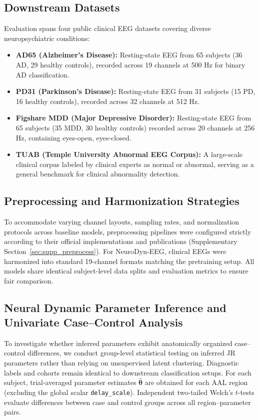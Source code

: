 \documentclass{article}
\begin{document}
{\subsection{Downstream Datasets}
Evaluation spans four public clinical EEG datasets covering diverse neuropsychiatric conditions:
\begin{itemize}
    \item \textbf{AD65 (Alzheimer's Disease):} Resting-state EEG from 65 subjects (36 AD, 29 healthy controls), recorded across 19 channels at 500 Hz for binary AD classification.
    \item \textbf{PD31 (Parkinson's Disease):} Resting-state EEG from 31 subjects (15 PD, 16 healthy controls), recorded across 32 channels at 512 Hz.
    \item \textbf{Figshare MDD (Major Depressive Disorder):} Resting-state EEG from 65 subjects (35 MDD, 30 healthy controls) recorded across 20 channels at 256 Hz, containing eyes-open, eyes-closed.
    \item \textbf{TUAB (Temple University Abnormal EEG Corpus):} A large-scale clinical corpus labeled by clinical experts as normal or abnormal, serving as a general benchmark for clinical abnormality detection.
\end{itemize}

\subsection{Preprocessing and Harmonization Strategies}
\label{sec:downstream_preproc}
To accommodate varying channel layouts, sampling rates, and normalization protocols across baseline models, preprocessing pipelines were configured strictly according to their official implementations and publications (Supplementary Section~\ref{sec:supp_preprocess}). For NeuroDyn-EEG, clinical EEGs were harmonized into standard 19-channel formats matching the pretraining setup. All models share identical subject-level data splits and evaluation metrics to ensure fair comparison.

\subsection{Neural Dynamic Parameter Inference and Univariate Case--Control Analysis}
\label{sec:jr_param_stats_methods}
To investigate whether inferred parameters exhibit anatomically organized case--control differences, we conduct group-level statistical testing on inferred JR parameters rather than relying on unsupervised latent clustering. Diagnostic labels and cohorts remain identical to downstream classification setups. For each subject, trial-averaged parameter estimates $\hat{\boldsymbol{\theta}}$ are obtained for each AAL region (excluding the global scalar \texttt{delay\_scale}). Independent two-tailed Welch's $t$-tests \citep{welch1947generalization} evaluate differences between case and control groups across all region--parameter pairs. 

}
\end{document}
